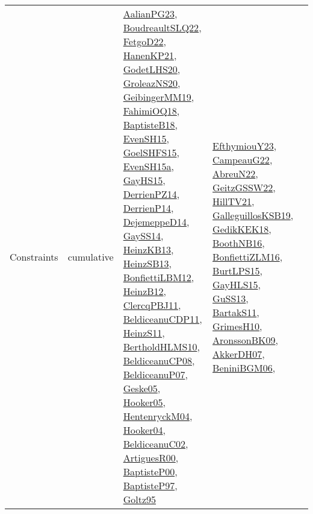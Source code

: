 {\begin{longtable}{lp{3cm}>{\raggedright}p{6cm}>{\raggedright}p{6cm}p{8cm}}
Constraints & cumulative & \href{papers/AalianPG23.pdf}{AalianPG23}\cite{AalianPG23}, \href{papers/BoudreaultSLQ22.pdf}{BoudreaultSLQ22}\cite{BoudreaultSLQ22}, \href{articles/FetgoD22.pdf}{FetgoD22}\cite{FetgoD22}, \href{papers/HanenKP21.pdf}{HanenKP21}\cite{HanenKP21}, \href{papers/GodetLHS20.pdf}{GodetLHS20}\cite{GodetLHS20}, \href{papers/GroleazNS20.pdf}{GroleazNS20}\cite{GroleazNS20}, \href{papers/GeibingerMM19.pdf}{GeibingerMM19}\cite{GeibingerMM19}, \href{articles/FahimiOQ18.pdf}{FahimiOQ18}\cite{FahimiOQ18}, \href{articles/BaptisteB18.pdf}{BaptisteB18}\cite{BaptisteB18}, \href{papers/EvenSH15.pdf}{EvenSH15}\cite{EvenSH15}, \href{articles/GoelSHFS15.pdf}{GoelSHFS15}\cite{GoelSHFS15}, \href{articles/EvenSH15a.pdf}{EvenSH15a}\cite{EvenSH15a}, \href{papers/GayHS15.pdf}{GayHS15}\cite{GayHS15}, \href{papers/DerrienPZ14.pdf}{DerrienPZ14}\cite{DerrienPZ14}, \href{papers/DerrienP14.pdf}{DerrienP14}\cite{DerrienP14}, \href{papers/DejemeppeD14.pdf}{DejemeppeD14}\cite{DejemeppeD14}, \href{papers/GaySS14.pdf}{GaySS14}\cite{GaySS14}, \href{papers/HeinzKB13.pdf}{HeinzKB13}\cite{HeinzKB13}, \href{articles/HeinzSB13.pdf}{HeinzSB13}\cite{HeinzSB13}, \href{papers/BonfiettiLBM12.pdf}{BonfiettiLBM12}\cite{BonfiettiLBM12}, \href{papers/HeinzB12.pdf}{HeinzB12}\cite{HeinzB12}, \href{papers/ClercqPBJ11.pdf}{ClercqPBJ11}\cite{ClercqPBJ11}, \href{articles/BeldiceanuCDP11.pdf}{BeldiceanuCDP11}\cite{BeldiceanuCDP11}, \href{papers/HeinzS11.pdf}{HeinzS11}\cite{HeinzS11}, \href{papers/BertholdHLMS10.pdf}{BertholdHLMS10}\cite{BertholdHLMS10}, \href{papers/BeldiceanuCP08.pdf}{BeldiceanuCP08}\cite{BeldiceanuCP08}, \href{papers/BeldiceanuP07.pdf}{BeldiceanuP07}\cite{BeldiceanuP07}, \href{papers/Geske05.pdf}{Geske05}\cite{Geske05}, \href{articles/Hooker05.pdf}{Hooker05}\cite{Hooker05}, \href{papers/HentenryckM04.pdf}{HentenryckM04}\cite{HentenryckM04}, \href{papers/Hooker04.pdf}{Hooker04}\cite{Hooker04}, \href{papers/BeldiceanuC02.pdf}{BeldiceanuC02}\cite{BeldiceanuC02}, \href{articles/ArtiguesR00.pdf}{ArtiguesR00}\cite{ArtiguesR00}, \href{articles/BaptisteP00.pdf}{BaptisteP00}\cite{BaptisteP00}, \href{papers/BaptisteP97.pdf}{BaptisteP97}\cite{BaptisteP97}, \href{papers/Goltz95.pdf}{Goltz95}\cite{Goltz95} & \href{papers/EfthymiouY23.pdf}{EfthymiouY23}\cite{EfthymiouY23}, \href{articles/CampeauG22.pdf}{CampeauG22}\cite{CampeauG22}, \href{articles/AbreuN22.pdf}{AbreuN22}\cite{AbreuN22}, \href{papers/GeitzGSSW22.pdf}{GeitzGSSW22}\cite{GeitzGSSW22}, \href{papers/HillTV21.pdf}{HillTV21}\cite{HillTV21}, \href{papers/GalleguillosKSB19.pdf}{GalleguillosKSB19}\cite{GalleguillosKSB19}, \href{articles/GedikKEK18.pdf}{GedikKEK18}\cite{GedikKEK18}, \href{papers/BoothNB16.pdf}{BoothNB16}\cite{BoothNB16}, \href{papers/BonfiettiZLM16.pdf}{BonfiettiZLM16}\cite{BonfiettiZLM16}, \href{papers/BurtLPS15.pdf}{BurtLPS15}\cite{BurtLPS15}, \href{papers/GayHLS15.pdf}{GayHLS15}\cite{GayHLS15}, \href{papers/GuSS13.pdf}{GuSS13}\cite{GuSS13}, \href{articles/BartakS11.pdf}{BartakS11}\cite{BartakS11}, \href{papers/GrimesH10.pdf}{GrimesH10}\cite{GrimesH10}, \href{papers/AronssonBK09.pdf}{AronssonBK09}\cite{AronssonBK09}, \href{papers/AkkerDH07.pdf}{AkkerDH07}\cite{AkkerDH07}, \href{papers/BeniniBGM06.pdf}{BeniniBGM06}\cite{BeniniBGM06}, 
\end{longtable}}
